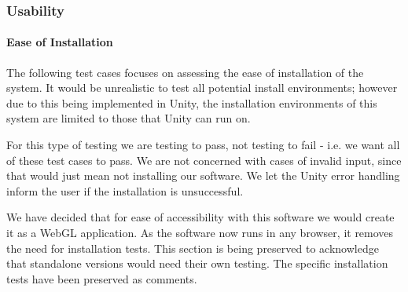 \documentclass[12pt, titlepage]{article}
\begin{document}
\subsubsection{Usability}
\paragraph{Ease of Installation}
The following test cases focuses on assessing the ease of installation of the 
system. It would be unrealistic to test all potential install environments; 
however due to this being implemented in Unity, the installation environments 
of this system are limited to those that Unity can run on.

For this type of testing we are testing to pass, not testing to fail - i.e. we 
want all of these test cases to pass. We are not concerned with cases of 
invalid input, since that would just mean not installing our software. We let 
the Unity error handling inform the user if the installation is unsuccessful.

We have decided that for ease of accessibility with this software we would 
create it as a WebGL application. As the software now runs in any browser, it 
removes the need for installation tests. This section is being preserved to 
acknowledge that standalone versions would need their own testing. The specific 
installation tests have been preserved as comments.
\end{document}
